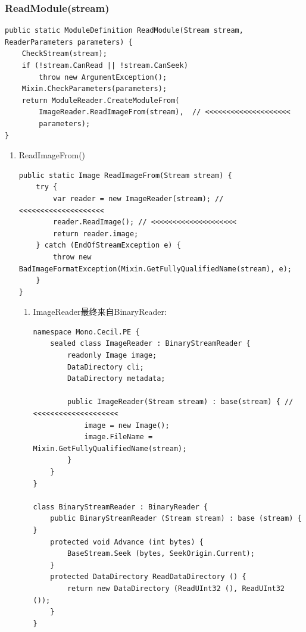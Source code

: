 \documentclass[9pt, b5paper]{article}
\begin{document}
\subsubsection{ReadModule(stream)}
\label{sec-10-1-3}
\begin{verbatim}
public static ModuleDefinition ReadModule(Stream stream, ReaderParameters parameters) {
    CheckStream(stream);
    if (!stream.CanRead || !stream.CanSeek)
        throw new ArgumentException();
    Mixin.CheckParameters(parameters);
    return ModuleReader.CreateModuleFrom(
        ImageReader.ReadImageFrom(stream),  // <<<<<<<<<<<<<<<<<<<< 
        parameters);
}
\end{verbatim}
\begin{enumerate}
\item ReadImageFrom()
\label{sec-10-1-3-1}
\begin{verbatim}
public static Image ReadImageFrom(Stream stream) {
    try {
        var reader = new ImageReader(stream); // <<<<<<<<<<<<<<<<<<<< 
        reader.ReadImage(); // <<<<<<<<<<<<<<<<<<<< 
        return reader.image;
    } catch (EndOfStreamException e) {
        throw new BadImageFormatException(Mixin.GetFullyQualifiedName(stream), e);
    }
}
\end{verbatim}
\begin{enumerate}
\item ImageReader最终来自BinaryReader:
\label{sec-10-1-3-1-1}
\begin{verbatim}
namespace Mono.Cecil.PE {
    sealed class ImageReader : BinaryStreamReader {
        readonly Image image;
        DataDirectory cli;
        DataDirectory metadata;
        
        public ImageReader(Stream stream) : base(stream) { // <<<<<<<<<<<<<<<<<<<< 
            image = new Image();
            image.FileName = Mixin.GetFullyQualifiedName(stream);
        }
    }
}

class BinaryStreamReader : BinaryReader {
    public BinaryStreamReader (Stream stream) : base (stream) { }
    protected void Advance (int bytes) {
        BaseStream.Seek (bytes, SeekOrigin.Current);
    }
    protected DataDirectory ReadDataDirectory () {
        return new DataDirectory (ReadUInt32 (), ReadUInt32 ());
    }
}


\end{verbatim}
\end{enumerate}
\end{enumerate}
\end{document}
